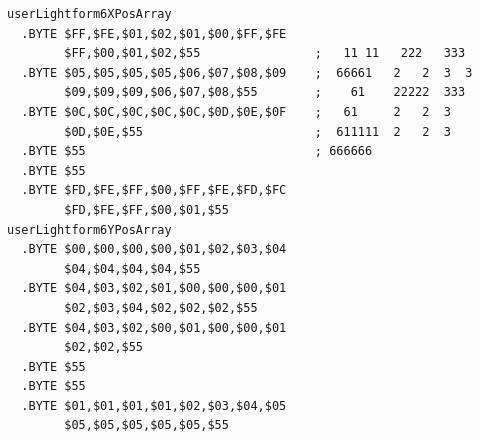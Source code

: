 \begin{minipage}[b]{0.68\linewidth}
\begin{lrbox}{\mybox}%
\begin{lstlisting}[basicstyle=\ttfamily\tiny,escapechar=\%]
userLightform6XPosArray
  .BYTE $FF,$FE,$01,$02,$01,$00,$FF,$FE
        $FF,$00,$01,$02,$55                ;   11 11   222   333 
  .BYTE $05,$05,$05,$05,$06,$07,$08,$09    ;  66661   2   2  3  3
        $09,$09,$09,$06,$07,$08,$55        ;    61    22222  333 
  .BYTE $0C,$0C,$0C,$0C,$0C,$0D,$0E,$0F    ;   61     2   2  3   
        $0D,$0E,$55                        ;  611111  2   2  3    
  .BYTE $55                                ; 666666              
  .BYTE $55                                                         
  .BYTE $FD,$FE,$FF,$00,$FF,$FE,$FD,$FC
        $FD,$FE,$FF,$00,$01,$55     
userLightform6YPosArray
  .BYTE $00,$00,$00,$00,$01,$02,$03,$04
        $04,$04,$04,$04,$55
  .BYTE $04,$03,$02,$01,$00,$00,$00,$01
        $02,$03,$04,$02,$02,$02,$55
  .BYTE $04,$03,$02,$00,$01,$00,$00,$01
        $02,$02,$55
  .BYTE $55
  .BYTE $55
  .BYTE $01,$01,$01,$01,$02,$03,$04,$05
        $05,$05,$05,$05,$05,$55
\end{lstlisting}
\end{lrbox}%
\scalebox{0.8}{\usebox{\mybox}}

\end{minipage}
%
%
